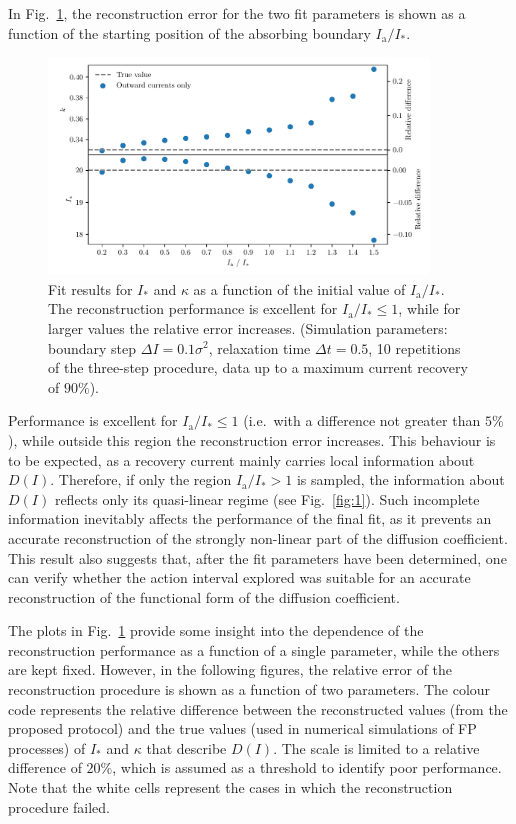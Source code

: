 {In Fig.~\ref{fig:different_position}, the reconstruction error for the two fit parameters is shown as a function of the starting position of the absorbing boundary $I_\mathrm{a}/I_\ast$. 
%
\begin{figure}[t]
    \centering
    \includegraphics[width=0.9\textwidth]{4_probing_the_diffusive_behavior/figs/final/different_position.pdf}
    \caption{Fit results for $I_\ast$ and $\kappa$ as a function of the initial value of $I_\mathrm{a}/I_\ast$. The reconstruction performance is excellent for $I_\mathrm{a}/I_\ast \leq 1$, while for larger values the relative error increases. (Simulation parameters: boundary step $\Delta I=0.1 \sigma^2$, relaxation time $\Delta t=0.5$, 10 repetitions of the three-step procedure, data up to a maximum current recovery of $90\%$).}
    \label{fig:different_position}
\end{figure}
%
Performance is excellent for $I_\mathrm{a}/I_\ast \leq 1$ {(i.e.\ with a difference not greater than $5\%$)}, while outside this region the reconstruction error increases. This behaviour is to be expected, as a recovery current mainly carries local information about $D(I)$. Therefore, if only the region $I_\mathrm{a}/I_\ast > 1$ is sampled, the information about $D(I)$ reflects only its quasi-linear regime (see Fig.~\ref{fig:1}). Such incomplete information inevitably affects the performance of the final fit, as it prevents an accurate reconstruction of the strongly non-linear part of the diffusion coefficient. This result also suggests that, after the fit parameters have been determined, one can verify whether the action interval explored was suitable for an accurate reconstruction of the functional form of the diffusion coefficient.

The plots in Fig.~\ref{fig:different_position} provide some insight into the dependence of the reconstruction performance as a function of a single parameter, while the others are kept fixed. However, in the following figures, the relative error of the reconstruction procedure is shown as a function of two parameters. The colour code represents the relative difference between the reconstructed values (from the proposed protocol) and the true values (used in numerical simulations of FP processes) of $I_\ast$ and $\kappa$ that describe $D(I)$. The scale is limited to a relative difference of $20\%$, which is assumed as a threshold to identify poor performance. Note that the white cells represent the cases in which the reconstruction procedure failed.

}
